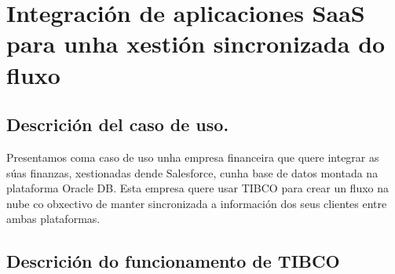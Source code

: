 \chapter{Integración de aplicaciones SaaS para unha xestión sincronizada do fluxo}
\label{chap:casouso}

\section{Descrición del caso de uso.}

Presentamos coma caso de uso unha empresa financeira que quere integrar as súas finanzas, xestionadas dende Salesforce, cunha base de datos montada na plataforma Oracle DB. Esta empresa quere usar TIBCO para crear un fluxo na nube co obxectivo de manter sincronizada a información dos seus clientes entre ambas plataformas.

\section{Descrición do funcionamento de TIBCO}

